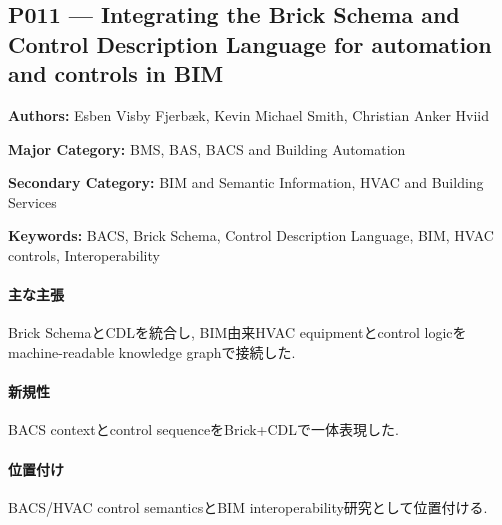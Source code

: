 \subsection{P011 --- Integrating the Brick Schema and Control Description Language for automation and controls in BIM}
\label{paper:P011}
\textbf{Authors:} Esben Visby Fjerbæk, Kevin Michael Smith, Christian Anker Hviid\par
\textbf{Major Category:} BMS, BAS, BACS and Building Automation\par
\textbf{Secondary Category:} BIM and Semantic Information, HVAC and Building Services\par
\textbf{Keywords:} BACS, Brick Schema, Control Description Language, BIM, HVAC controls, Interoperability\par
\paragraph{主な主張}
Brick SchemaとCDLを統合し, BIM由来HVAC equipmentとcontrol logicをmachine-readable knowledge graphで接続した. \cite{Fjerbaek:2026BrickCDL}
\paragraph{新規性}
BACS contextとcontrol sequenceをBrick+CDLで一体表現した.
\paragraph{位置付け}
BACS/HVAC control semanticsとBIM interoperability研究として位置付ける.
